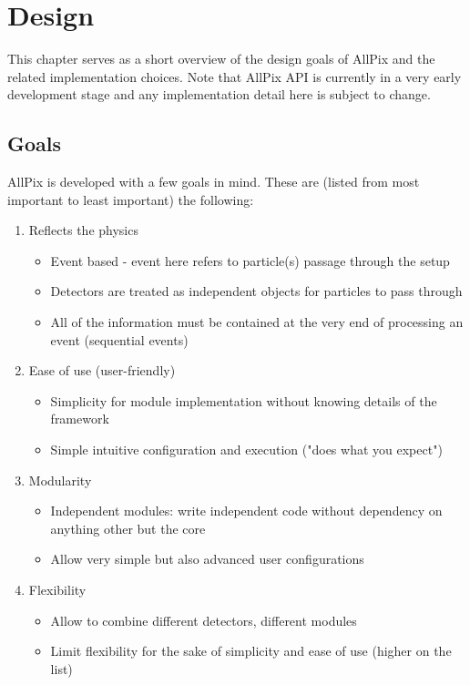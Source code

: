 \section{Design}
This chapter serves as a short overview of the design goals of AllPix and the related implementation choices. Note that AllPix API is currently in a very early development stage and any implementation detail here is subject to change.

\subsection{Goals}
AllPix is developed with a few goals in mind. These are (listed from most important to least important) the following:
\begin{enumerate}
    \item Reflects the physics
    \begin{itemize}
        \item Event based - event here refers to particle(s) passage through the setup
        \item Detectors are treated as independent objects for particles to pass through
        \item All of the information must be contained at the very end of processing an event (sequential events)
    \end{itemize}
    \item Ease of use (user-friendly) 
    \begin{itemize}
        \item Simplicity for module implementation without knowing details of the framework
        \item Simple intuitive configuration and execution ("does what you expect")
    \end{itemize}
    \item Modularity
    \begin{itemize}
        \item Independent modules: write independent code without dependency on anything other but the core
        \item Allow very simple but also advanced user configurations
    \end{itemize}
    \item Flexibility
    \begin{itemize}
        \item Allow to combine different detectors, different modules
        \item Limit flexibility for the sake of simplicity and ease of use (higher on the list)
    \end{itemize}
\end{enumerate}

